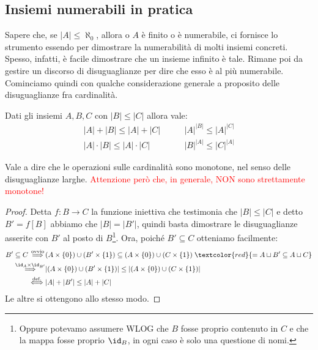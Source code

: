 \subsection{Insiemi numerabili in pratica}
Sapere che, se $|A| \leq \aleph_0$, allora o $A$ è finito o è numerabile, ci fornisce lo strumento essendo per dimostrare la numerabilità di molti insiemi concreti. Spesso, infatti,
è facile dimostrare che un insieme infinito è tale. Rimane poi da gestire un discorso di disuguaglianze per dire che esso è al più numerabile.\\
Cominciamo quindi con qualche considerazione generale a proposito delle disuguaglianze fra cardinalità.

\begin{remark}
	\label{compatibilità_operazioni_cardinalità}
	Dati gli insiemi $A,B,C$ con $|B| \leq |C|$ allora vale:
	\begin{align*}
		|A| + |B| \leq |A| + |C| \qquad & |A|^{|B|} \leq |A|^{|C|} \\
		|A| \cdot |B| \leq |A| \cdot |C| \qquad & |B|^{|A|} \leq |C|^{|A|}
	\end{align*}
\end{remark}

Vale a dire che le operazioni sulle cardinalità sono monotone, nel senso delle disuguaglianze larghe.
\textcolor{red}{Attenzione però che, in generale, NON sono strettamente monotone!}

\begin{proof}
	Detta $f : B \rightarrow C$ la funzione iniettiva che testimonia che $|B| \leq |C|$ e detto $B' = f[B]$ abbiamo che $|B| = |B'|$,
	quindi basta dimostrare le disuguaglianze asserite con $B'$ al posto di $B$\footnote{Oppure potevamo assumere WLOG che $B$ fosse proprio contenuto in $C$ e che la mappa
	fosse proprio $\id_B$, in ogni caso è solo una questione di nomi.}. Ora, poiché $B' \subseteq C$ otteniamo facilmente:
	\[ \begin{split}
		B' \subseteq C \overset{\text{ovvio}}{\implies}& (A \times \{0\}) \cup (B' \times \{1\}) \subseteq (A \times \{0\}) \cup (C \times \{1\}) \; \textcolor{red}{= A \sqcup B' \subseteq A \sqcup C}\\
					   \overset{\id_A \times \id_{B'}}{\implies}& |(A \times \{0\}) \cup (B' \times \{1\})| \leq |(A \times \{0\}) \cup (C \times \{1\})| \\
					   \overset{\text{def.}}{\iff}& |A| + |B'| \leq |A| + |C|
	\end{split}
		\]
	Le altre si ottengono allo stesso modo.
\end{proof}

